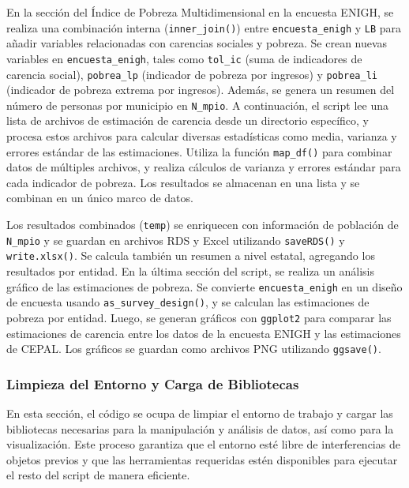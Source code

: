 \documentclass[
  12pt,
]{book}
\begin{document}
En la sección del Índice de Pobreza Multidimensional en la encuesta ENIGH, se realiza una combinación interna (\texttt{inner\_join()}) entre \texttt{encuesta\_enigh} y \texttt{LB} para añadir variables relacionadas con carencias sociales y pobreza. Se crean nuevas variables en \texttt{encuesta\_enigh}, tales como \texttt{tol\_ic} (suma de indicadores de carencia social), \texttt{pobrea\_lp} (indicador de pobreza por ingresos) y \texttt{pobrea\_li} (indicador de pobreza extrema por ingresos). Además, se genera un resumen del número de personas por municipio en \texttt{N\_mpio}. A continuación, el script lee una lista de archivos de estimación de carencia desde un directorio específico, y procesa estos archivos para calcular diversas estadísticas como media, varianza y errores estándar de las estimaciones. Utiliza la función \texttt{map\_df()} para combinar datos de múltiples archivos, y realiza cálculos de varianza y errores estándar para cada indicador de pobreza. Los resultados se almacenan en una lista y se combinan en un único marco de datos.

Los resultados combinados (\texttt{temp}) se enriquecen con información de población de \texttt{N\_mpio} y se guardan en archivos RDS y Excel utilizando \texttt{saveRDS()} y \texttt{write.xlsx()}. Se calcula también un resumen a nivel estatal, agregando los resultados por entidad. En la última sección del script, se realiza un análisis gráfico de las estimaciones de pobreza. Se convierte \texttt{encuesta\_enigh} en un diseño de encuesta usando \texttt{as\_survey\_design()}, y se calculan las estimaciones de pobreza por entidad. Luego, se generan gráficos con \texttt{ggplot2} para comparar las estimaciones de carencia entre los datos de la encuesta ENIGH y las estimaciones de CEPAL. Los gráficos se guardan como archivos PNG utilizando \texttt{ggsave()}.

\hypertarget{limpieza-del-entorno-y-carga-de-bibliotecas-10}{%
\subsubsection*{Limpieza del Entorno y Carga de Bibliotecas}\label{limpieza-del-entorno-y-carga-de-bibliotecas-10}}

En esta sección, el código se ocupa de limpiar el entorno de trabajo y cargar las bibliotecas necesarias para la manipulación y análisis de datos, así como para la visualización. Este proceso garantiza que el entorno esté libre de interferencias de objetos previos y que las herramientas requeridas estén disponibles para ejecutar el resto del script de manera eficiente.
\end{document}
